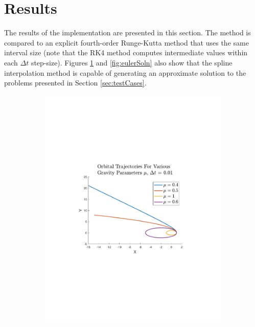 \documentclass{article}
\begin{document}
\section{Results}\label{sec:results}
The results of the implementation are presented in this section. The method is compared to an explicit fourth-order Runge-Kutta method that uses the same interval size (note that the RK4 method computes intermediate values within each $\Delta t$ step-size). Figures \ref{fig:newtonSoln} and \ref{fig:eulerSoln} also show that the spline interpolation method is capable of generating an approximate solution to the problems presented in Section \ref{sec:testCases}.
\begin{figure}[H]
	\centering
	\begin{subfigure}{0.45\linewidth}
		\includegraphics[trim={1.5in, 3in, 1.5in, 3in}, clip, width=\linewidth]{newtonOrbit}
		\caption{}\label{fig:newtonSoln}
	\end{subfigure}
	\begin{subfigure}{0.45\linewidth}

\end{subfigure}
\end{figure}
\end{document}
